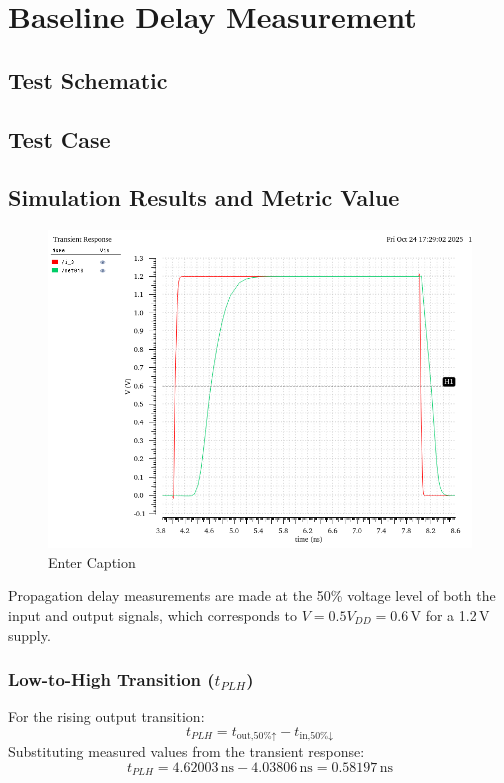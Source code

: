 \documentclass[12pt]{article}
\begin{document}
\newpage

\section{Baseline Delay Measurement}
\subsection{Test Schematic}



\newpage

\subsection{Test Case}



\newpage

\subsection{Simulation Results and Metric Value}
\begin{figure}[H]
    \centering
    \includegraphics[width=0.5\linewidth]{writeup//figures/baseline_delay_transient.png}
    \caption{Enter Caption}
\end{figure}
Propagation delay measurements are made at the 50\% voltage level of both the input and output signals, which corresponds to \( V = 0.5V_{DD} = 0.6\,\text{V} \) for a 1.2\,V supply.

\subsubsection*{Low-to-High Transition (\(t_{PLH}\))}

For the rising output transition:
\[
t_{PLH} = t_{\text{out,50\%↑}} - t_{\text{in,50\%↓}}
\]
Substituting measured values from the transient response:
\[
t_{PLH} = 4.62003\,\text{ns} - 4.03806\,\text{ns} = 0.58197\,\text{ns}
\]
\end{document}

